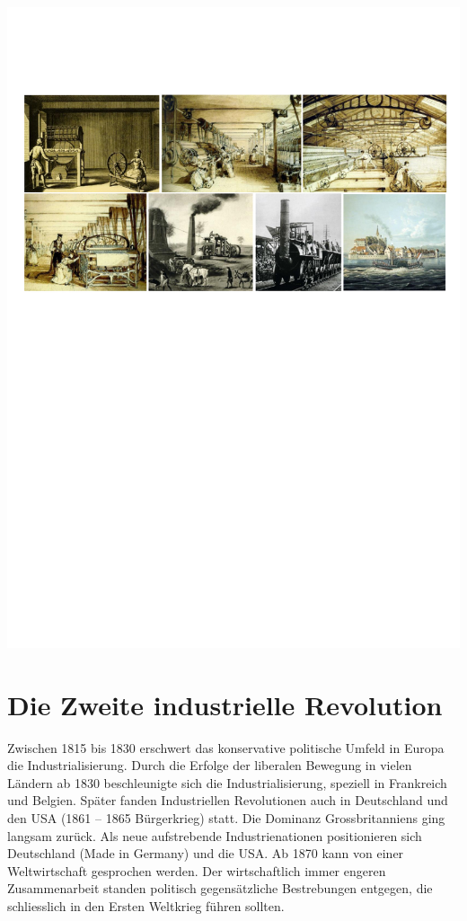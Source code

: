 \documentclass[10pt, openright=true]{scrartcl}
\begin{document}
\includegraphics[width=1\textwidth]{images/maschinen}
\clearpage

\section{Die Zweite industrielle Revolution}
Zwischen 1815 bis 1830 erschwert das konservative politische Umfeld in Europa die Industrialisierung. Durch die Erfolge der liberalen Bewegung in vielen Ländern ab 1830 beschleunigte sich die Industrialisierung, speziell in Frankreich und Belgien. Später fanden Industriellen Revolutionen auch in Deutschland und den USA (1861 – 1865 Bürgerkrieg) statt. Die Dominanz Grossbritanniens ging langsam zurück. Als neue aufstrebende Industrienationen positionieren sich Deutschland (\glqq Made in Germany\grqq ) und die USA. Ab 1870 kann von einer Weltwirtschaft gesprochen werden. Der wirtschaftlich immer engeren Zusammenarbeit standen politisch gegensätzliche Bestrebungen entgegen, die schliesslich in den Ersten Weltkrieg führen sollten.
\end{document}
